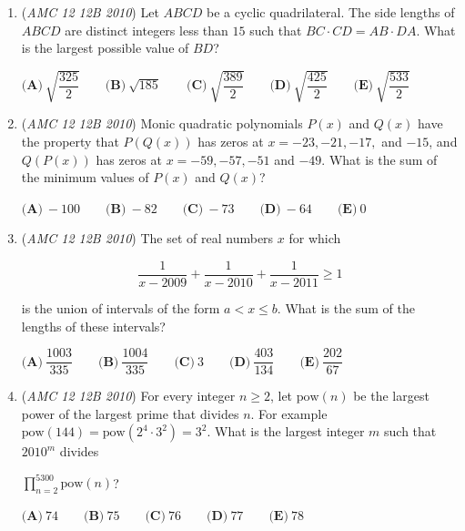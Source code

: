 \begin{enumerate}
 
$P(1) = P(3) = P(5) = P(7) = a$, and

$P(2) = P(4) = P(6) = P(8) = -a$.


 


 What is the smallest possible value of $a$?


 $\textbf{(A)}\ 105 \qquad \textbf{(B)}\ 315 \qquad \textbf{(C)}\ 945 \qquad \textbf{(D)}\ 7! \qquad \textbf{(E)}\ 8!$


	\item (\textit{AMC 12 12B 2010}) Let $ABCD$ be a cyclic quadrilateral. The side lengths of $ABCD$ are distinct integers less than $15$ such that $BC\cdot CD=AB\cdot DA$. What is the largest possible value of $BD$?


 $\textbf{(A)}\ \sqrt{\dfrac{325}{2}} \qquad \textbf{(B)}\ \sqrt{185} \qquad \textbf{(C)}\ \sqrt{\dfrac{389}{2}} \qquad \textbf{(D)}\ \sqrt{\dfrac{425}{2}} \qquad \textbf{(E)}\ \sqrt{\dfrac{533}{2}}$


	\item (\textit{AMC 12 12B 2010}) Monic quadratic polynomials $P(x)$ and $Q(x)$ have the property that $P(Q(x))$ has zeros at $x=-23, -21, -17,$ and $-15$, and $Q(P(x))$ has zeros at $x=-59,-57,-51$ and $-49$. What is the sum of the minimum values of $P(x)$ and $Q(x)$? 


 $\textbf{(A)}\ -100 \qquad \textbf{(B)}\ -82 \qquad \textbf{(C)}\ -73 \qquad \textbf{(D)}\ -64 \qquad \textbf{(E)}\ 0$


	\item (\textit{AMC 12 12B 2010}) The set of real numbers $x$ for which 


 
 \[\dfrac{1}{x-2009}+\dfrac{1}{x-2010}+\dfrac{1}{x-2011}\ge1\]


 is the union of intervals of the form $a<x\le b$. What is the sum of the lengths of these intervals?


 $\textbf{(A)}\ \dfrac{1003}{335} \qquad \textbf{(B)}\ \dfrac{1004}{335} \qquad \textbf{(C)}\ 3 \qquad \textbf{(D)}\ \dfrac{403}{134} \qquad \textbf{(E)}\ \dfrac{202}{67}$


	\item (\textit{AMC 12 12B 2010}) For every integer $n\ge2$, let $\text{pow}(n)$ be the largest power of the largest prime that divides $n$. For example $\text{pow}(144)=\text{pow}(2^4\cdot3^2)=3^2$. What is the largest integer $m$ such that $2010^m$ divides


 
$\prod_{n=2}^{5300}\text{pow}(n)$?


 


 

$\textbf{(A)}\ 74 \qquad \textbf{(B)}\ 75 \qquad \textbf{(C)}\ 76 \qquad \textbf{(D)}\ 77 \qquad \textbf{(E)}\ 78$


\end{enumerate}
